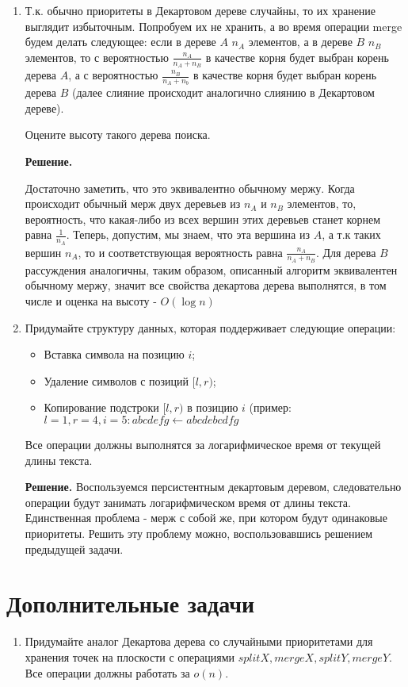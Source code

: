 \begin{enumerate}
	\item Т.к. обычно приоритеты в Декартовом дереве случайны, то их хранение выглядит избыточным.
	Попробуем их не хранить, а во время операции merge будем делать следующее: если в дереве
	$A$ $n_A$ элементов, а в дереве $B$ $n_B$ элементов, то с вероятностью 
	$\frac{n_A}{n_A + n_B}$ в качестве корня будет выбран корень дерева $A$, а с вероятностью 
	$\frac{n_B}{n_A + n_b}$ в качестве корня будет выбран корень дерева $B$ (далее слияние 
	происходит аналогично слиянию в Декартовом дереве).
	
	Оцените высоту такого дерева поиска.
	
	\textbf{Решение.}
	
	Достаточно заметить, что это эквивалентно обычному мержу. Когда происходит обычный мерж двух деревьев из 
	$n_A$ и $n_B$ элементов, то, вероятность, что какая-либо из всех вершин этих деревьев станет корнем равна 
	$\frac{1}{n_A}$. Теперь, допустим, мы знаем, что эта вершина из $A$, а т.к таких вершин $n_A$, то и 
	соответствующая вероятность равна $\frac{n_A}{n_A + n_B}$. Для дерева $B$ рассуждения аналогичны, таким 
	образом, описанный алгоритм эквивалентен обычному мержу, значит все свойства декартова дерева выполнятся, в 
	том числе и оценка на высоту - $O(\log n)$
	
	\item Придумайте структуру данных, которая поддерживает следующие операции:
	
	\begin{itemize}
		\item Вставка символа на позицию $i$;
		\item Удаление символов с позиций $[l, r)$;
		\item Копирование подстроки $[l, r)$ в позицию $i$ (пример: $l = 1, r = 4, i = 5 : abcdefg \leftarrow abcdebcdfg$
	\end{itemize}
	
	Все операции должны выполнятся за логарифмическое время от текущей длины текста.
	
	\textbf{Решение.}
	Воспользуемся персистентным декартовым деревом, следовательно операции будут занимать логарифмическом время 
	от длины текста. Единственная проблема - мерж с собой же, при котором будут одинаковые приоритеты. Решить эту 
	проблему можно, воспользовавшись решением предыдущей задачи.
	
\end{enumerate}

\section*{Дополнительные задачи}
\begin{enumerate}
	\item Придумайте аналог Декартова дерева со случайными приоритетами для хранения точек на плоскости с 
	операциями $splitX, mergeX, splitY, mergeY$. Все операции должны работать за $o(n)$.
\end{enumerate}

